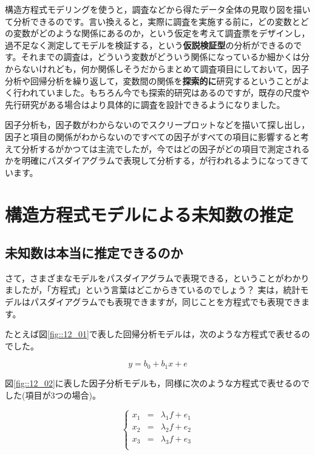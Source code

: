 \documentclass{ltjsbook}
\begin{document}
構造方程式モデリングを使うと，調査などから得たデータ全体の見取り図を描いて分析できるのです。言い換えると，実際に調査を実施する前に，どの変数とどの変数がどのような関係にあるのか，という仮定を考えて調査票をデザインし，過不足なく測定してモデルを検証する，という\textbf{仮説検証型}の分析ができるのです。それまでの調査は，どういう変数がどういう関係になっているか細かくは分からないけれども，何か関係しそうだからまとめて調査項目にしておいて，因子分析や回帰分析を繰り返して，変数間の関係を\textbf{探索的に}研究するということがよく行われていました。もちろん今でも探索的研究はあるのですが，既存の尺度や先行研究がある場合はより具体的に調査を設計できるようになりました。

因子分析も，因子数がわからないのでスクリープロットなどを描いて探し出し，因子と項目の関係がわからないのですべての因子がすべての項目に影響すると考えて分析するがかつては主流でしたが，今ではどの因子がどの項目で測定されるかを明確にパスダイアグラムで表現して分析する，が行われるようになってきています。



\section{構造方程式モデルによる未知数の推定}
\subsection{未知数は本当に推定できるのか}
さて，さまざまなモデルをパスダイアグラムで表現できる，ということがわかりましたが，「方程式」という言葉はどこからきているのでしょう？
実は，統計モデルはパスダイアグラムでも表現できますが，同じことを方程式でも表現できます。

たとえば図\ref{fig::12_01}で表した回帰分析モデルは，次のような方程式で表せるのでした。

\[ y = b_0 + b_1 x + e \]

図\ref{fig::12_02}に表した因子分析モデルも，同様に次のような方程式で表せるのでした(項目が3つの場合)。

\[ \left \{
    \begin{array}{rcl}
        x_1 & = & \lambda_1 f + e_1 \\
        x_2 & = & \lambda_2 f + e_2 \\
        x_3 & = & \lambda_3 f + e_3 \\
    \end{array}
    \right .
\]
\end{document}
